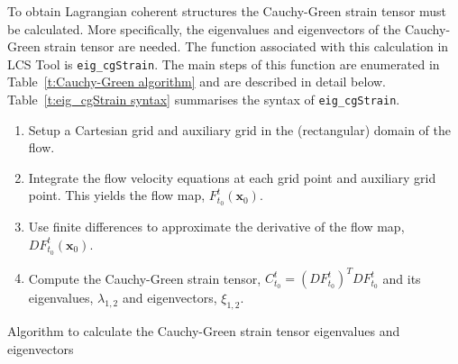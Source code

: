 \documentclass{article}
\begin{document}
To obtain Lagrangian coherent structures the Cauchy-Green strain tensor must be calculated. More specifically, the eigenvalues and eigenvectors of the Cauchy-Green strain tensor are needed. The function associated with this calculation in LCS Tool is \lstinline!eig_cgStrain!. The main steps of this function are enumerated in Table~\ref{t:Cauchy-Green algorithm} and are described in detail below. Table~\ref{t:eig_cgStrain syntax} summarises the syntax of \lstinline!eig_cgStrain!.

\begin{table}
\begin{enumerate}
\item Setup a Cartesian grid and auxiliary grid in the (rectangular) domain of the flow.
\item Integrate the flow velocity equations at each grid point and auxiliary grid point. This yields the flow map, $F_{t_0}^t(\boldsymbol x_0)$.
\item Use finite differences to approximate the derivative of the flow map, $D F_{t_0}^t(\boldsymbol x_0)$.
\item Compute the Cauchy-Green strain tensor, $C_{t_0}^t = \left(D F_{t_0}^t\right)^T D F_{t_0}^t$ and its eigenvalues, $\lambda_{1,2}$ and eigenvectors, $\xi_{1,2}$.
\end{enumerate}
\caption{Algorithm to calculate the Cauchy-Green strain tensor eigenvalues and eigenvectors}
\label{t:Cauchy-Green algorithm}
\end{table}
\end{document}

